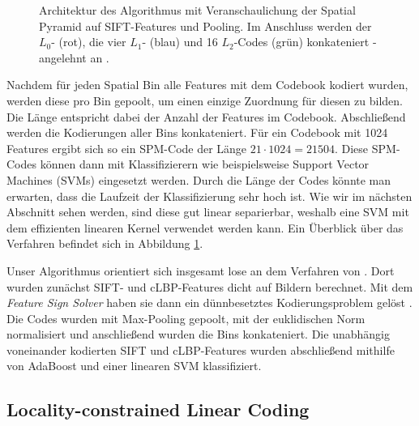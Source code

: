 \begin{figure}
	\centering
	\caption{Architektur des Algorithmus mit Veranschaulichung der Spatial Pyramid auf SIFT-Features und Pooling. Im Anschluss werden der $L_0$- (rot), die vier $L_1$- (blau) und 16 $L_2$-Codes (grün) konkateniert - angelehnt an \cite{yygh09}.}
	\label{img:architecture}
\end{figure}

Nachdem für jeden Spatial Bin alle Features mit dem Codebook kodiert wurden, werden diese pro Bin gepoolt, um einen einzige Zuordnung für diesen zu bilden. Die Länge entspricht dabei der Anzahl der Features im Codebook. Abschließend werden die Kodierungen aller Bins konkateniert. Für ein Codebook mit 1024 Features ergibt sich so ein SPM-Code der Länge $21 \cdot 1024 = 21504$. Diese SPM-Codes können dann mit Klassifizierern wie beispielsweise Support Vector Machines (SVMs) eingesetzt werden. Durch die Länge der Codes könnte man erwarten, dass die Laufzeit der Klassifizierung sehr hoch ist. Wie wir im nächsten Abschnitt sehen werden, sind diese gut linear separierbar, weshalb eine SVM mit dem effizienten linearen Kernel verwendet werden kann. Ein Überblick über das Verfahren befindet sich in Abbildung \ref{img:architecture}.

Unser Algorithmus orientiert sich insgesamt lose an dem Verfahren von \cite{ywkjwh13}. Dort wurden zunächst SIFT- und cLBP-Features dicht auf Bildern berechnet. Mit dem \emph{Feature Sign Solver} haben sie dann ein dünnbesetztes Kodierungsproblem gelöst \cite{lbrn07}. Die Codes wurden mit Max-Pooling gepoolt, mit der euklidischen Norm normalisiert und anschließend wurden die Bins konkateniert. Die unabhängig voneinander kodierten SIFT und cLBP-Features wurden abschließend mithilfe von AdaBoost und einer linearen SVM klassifiziert.

\subsection{Locality-constrained Linear Coding}

